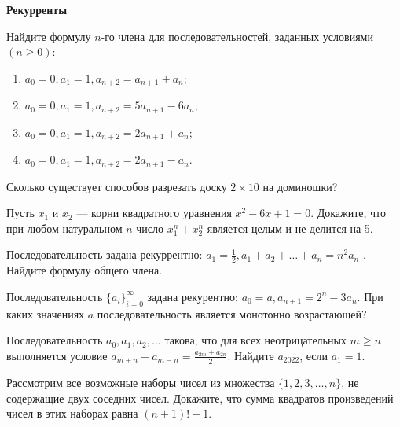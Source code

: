 \documentclass{article}
\begin{document}
\large

\begin{center}
	\textbf{Рекурренты}
\end{center}

\begin{enumerate_boxed}
	
\item Найдите формулу $n$-го члена для последовательностей, заданных условиями $( n  \geqslant 0)$:
\begin{enumerate}
	\item $a_0 = 0, a_1 = 1, a_{n + 2} = a_{n + 1} + a_n;$
	\item $a_0 = 0, a_1 = 1, a_{n + 2} = 5a_{n + 1} - 6a_n;$ 
	\item $a_0 = 0, a_1 = 1, a_{n + 2} = 2a_{n + 1} + a_n;$ 
	\item $a_0 = 0, a_1 = 1, a_{n + 2} = 2a_{n + 1} - a_n.$ 
\end{enumerate}

	
\item Сколько существует способов разрезать доску $2 \times 10$ на доминошки?

\item Пусть $x_1$ и $x_2$ — корни квадратного уравнения $x^2 - 6x + 1 = 0$.
Докажите, что при любом натуральном $n$ число $x^n_1 + x^n_2$ является целым и не делится на 5.

\item Последовательность задана рекуррентно: $ a_1 = \frac{1}{2} , a_1 + a_2 + \dotsc + a_n = n^2 a_n $ .
Найдите формулу общего члена.

\item Последовательность $ \{a_i\}^{\infty}_{i=0} $ задана рекурентно: $ a_0 = a, a_{n+1} = 2^n - 3a_n $.
При каких значениях $ a $ последовательность является монотонно возрастающей?

\item Последовательность $a_0, a_1, a_2, \ldots$ такова, что для всех неотрицательных $m \geq n$ выполняется условие $a_{m+n} + a_{m-n} = \frac{a_{2m} + a_{2n}}{2}$.
Найдите $a_{2022}$, если $a_1 = 1$.

\item Рассмотрим все возможные наборы чисел из множества $\{1, 2, 3, \dotsc , n\}$, не содержащие двух соседних чисел.
Докажите, что сумма квадратов произведений чисел в этих наборах равна $(n + 1)! - 1$.

\end{enumerate_boxed}
\end{document}
